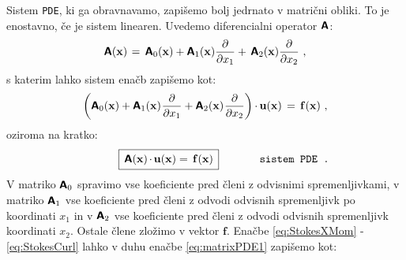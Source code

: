 Sistem \texttt{PDE}, ki ga obravnavamo, zapišemo bolj jedrnato v matrični obliki. To je enostavno, če je sistem linearen. Uvedemo diferencialni operator $\bm{\mathsf{A}}$:
\begin{equation}
	\mathbsf{A}(\mathbf{x}) \mkern2mu
	=
	\, \mathbsf{A}_0(\mathbf{x}) + \mathbsf{A}_1(\mathbf{x}) \frac{\pd}{\pd x_1} + \, \mathbsf{A}_2(\mathbf{x}) \frac{\pd}{\pd x_2} \ ,
	\label{eq:AMatrixDefinition}
	\vspace{-1mm}
\end{equation}
\vspace{1mm}
s katerim lahko sistem enačb zapišemo kot:
\begin{equation}
	\qty(\mathbsf{A}_0(\mathbf{x}) + \mathbsf{A}_1(\mathbf{x}) \mkern1mu \frac{\pd}{\pd x_1} + \mathbsf{A}_2(\mathbf{x}) \mkern1mu \frac{\pd}{\pd x_2}) \mkern-1mu \cdot \mkern-1mu \mathbf{u}(\mathbf{x}) \, = \, \mathbf{f}(\mathbf{x}) \ ,
	\label{eq:matrixPDE1}
	\vspace{-1mm}
\end{equation}
oziroma na kratko:
\vspace{2mm}
\begin{equation}
	\hspace{12mm} \boxed{
		\, \vphantom{\big(} \mathbsf{A}(\mathbf{x}) \mkern-1.5mu \cdot \mkern-1.5mu \mathbf{u}(\mathbf{x}) = \, \mathbf{f}(\mathbf{x}) \,
	}\hspace{1.3cm} \texttt{sistem PDE .}
	\label{eq:compactPDE}
	\vspace{1.5mm}
\end{equation}
V matriko $\bm{\mathsf{A}}_0$ spravimo vse koeficiente pred členi z odvisnimi spremenljivkami, v matriko $\bm{\mathsf{A}}_1$ vse koeficiente pred členi z odvodi odvisnih spremenljivk po koordinati $x_1$ in v $\bm{\mathsf{A}}_2$ vse koeficiente pred členi z odvodi odvisnih spremenljivk koordinati $x_2$. Ostale člene zložimo v vektor $\mathbf{f}$. Enačbe \eqref{eq:StokesXMom} - \eqref{eq:StokesCurl} lahko v duhu enačbe \eqref{eq:matrixPDE1} zapišemo kot:
\vspace{1.5mm}

